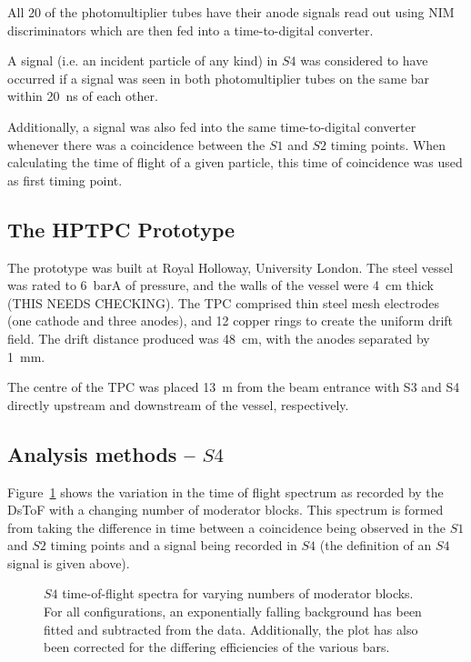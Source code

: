     All 20 of the photomultiplier tubes have their anode signals read out using NIM discriminators which are then fed into a time-to-digital converter. 
    
    A signal (i.e. an incident particle of any kind) in $S4$ was considered to have occurred if a signal was seen in both photomultiplier tubes on the same bar within 20~ns of each other.
    
    Additionally, a signal was also fed into the same time-to-digital converter whenever there was a coincidence between the $S1$ and $S2$ timing points. 
    When calculating the time of flight of a given particle, this time of coincidence was used as first timing point.
    
    \subsection{The HPTPC Prototype}
    The prototype was built at Royal Holloway, University London.
    The steel vessel was rated to 6~barA of pressure, and the walls of the vessel were 4~cm thick (THIS NEEDS CHECKING).
    The TPC comprised thin steel mesh electrodes (one cathode and three anodes), and 12 copper rings to create the uniform drift field.
    The drift distance produced was 48~cm, with the anodes separated by 1~mm.
    
    The centre of the TPC was placed 13~m from the beam entrance with S3 and S4 directly upstream and downstream of the vessel, respectively.
    
	\subsection{Analysis methods -- $S4$}

	Figure~\ref{fig:s4tof} shows the variation in the time of flight spectrum as recorded by the DsToF with a changing number of moderator blocks. 
	This spectrum is formed from taking the difference in time between a coincidence being observed in the $S1$ and $S2$ timing points and a signal being recorded in $S4$ (the definition of an $S4$ signal is given above).
	
	\begin{figure}[h]
		\begin{adjustbox}{max totalsize={.8\textwidth}{.7\textheight},center}
			
		\end{adjustbox}
		\caption{$S4$ time-of-flight spectra for varying numbers of moderator blocks. For all configurations, an exponentially falling background has been fitted and subtracted from the data. Additionally, the plot has also been corrected for the differing efficiencies of the various bars.}
		\label{fig:s4tof}	
	\end{figure}

